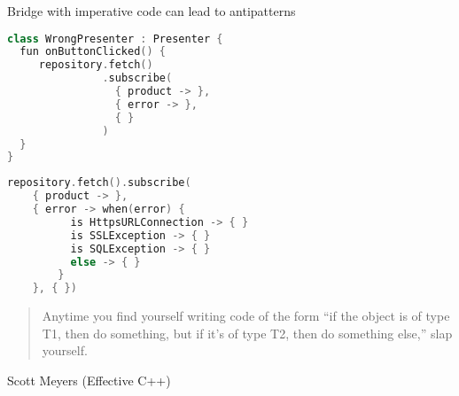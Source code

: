 \documentclass[10pt]{beamer}
\begin{document}
\begin{frame}[fragile]
	Bridge with imperative code can lead to antipatterns
\begin{lstlisting}[language=C++,basicstyle=\ttfamily,keywordstyle=\color{red}]
class WrongPresenter : Presenter {
  fun onButtonClicked() {
     repository.fetch()
               .subscribe(
                 { product -> },
                 { error -> },
                 { }
               )
  }
}
\end{lstlisting}
\end{frame}
\begin{frame}[fragile]
\begin{lstlisting}[language=C++,basicstyle=\ttfamily,keywordstyle=\color{red}]
repository.fetch().subscribe(
    { product -> },
    { error -> when(error) {
          is HttpsURLConnection -> { }
          is SSLException -> { }
          is SQLException -> { }
          else -> { }
        }
    }, { })
\end{lstlisting}
	\begin{quotation}
Anytime you find yourself writing code of the form “if the object is of type T1, then do something, but if it’s of type T2, then do something else,” slap yourself.
	\end{quotation}
	Scott Meyers (Effective C++)
\end{frame}


% 
% 
\end{document}
